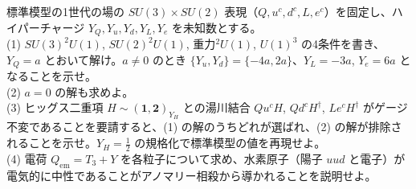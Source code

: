 \begin{problem}[難易度 D]\label{ch09-prob-charge}
標準模型の1世代の場の $SU(3)\times SU(2)$ 表現（$Q,u^c,d^c,L,e^c$）を固定し、ハイパーチャージ $Y_Q,Y_u,Y_d,Y_L,Y_e$ を未知数とする。\\
(1) $SU(3)^2U(1)$, $SU(2)^2U(1)$, 重力$^2U(1)$, $U(1)^3$ の4条件を書き、$Y_Q=a$ とおいて解け。$a\ne0$ のとき $\{Y_u,Y_d\}=\{-4a,2a\}$、$Y_L=-3a$, $Y_e=6a$ となることを示せ。\\
(2) $a=0$ の解も求めよ。\\
(3) ヒッグス二重項 $H\sim(\mathbf 1,\mathbf 2)_{Y_H}$ との湯川結合 $Qu^cH$, $Qd^cH^\dagger$, $Le^cH^\dagger$ がゲージ不変であることを要請すると、(1) の解のうちどれが選ばれ、(2) の解が排除されることを示せ。$Y_H=\frac12$ の規格化で標準模型の値を再現せよ。\\
(4) 電荷 $Q_{\mathrm{em}}=T_3+Y$ を各粒子について求め、水素原子（陽子 $uud$ と電子）が電気的に中性であることがアノマリー相殺から導かれることを説明せよ。
\end{problem}

